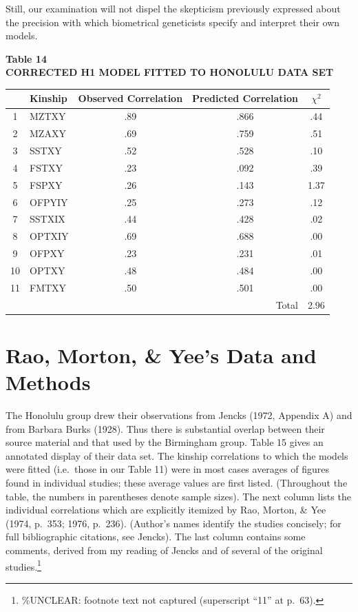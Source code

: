 ﻿\documentclass[12pt]{article}
\begin{document}
Still, our examination will not dispel the skepticism previously expressed about the precision with which biometrical geneticists specify and interpret their own models.

\begin{center}
\textbf{Table 14}\\
\textbf{CORRECTED H1 MODEL FITTED TO HONOLULU DATA SET}
\end{center}
\begin{center}
\begin{tabular}{c l c c c}
\hline
 & Kinship & Observed Correlation & Predicted Correlation & $\chi^2$ \\
\hline
1 & MZTXY & .89 & .866 & .44 \\
2 & MZAXY & .69 & .759 & .51 \\
3 & SSTXY & .52 & .528 & .10 \\
4 & FSTXY & .23 & .092 & .39 \\
5 & FSPXY & .26 & .143 & 1.37 \\
6 & OFPYIY & .25 & .273 & .12 \\
7 & SSTXIX & .44 & .428 & .02 \\
8 & OPTXIY & .69 & .688 & .00 \\
9 & OFPXY & .23 & .231 & .01 \\
10 & OPTXY & .48 & .484 & .00 \\
11 & FMTXY & .50 & .501 & .00 \\
\hline
\multicolumn{4}{r}{Total} & 2.96 \\
\hline
\end{tabular}
\end{center}

\section{Rao, Morton, \& Yee's Data and Methods}

The Honolulu group drew their observations from Jencks (1972, Appendix A) and from Barbara Burks (1928). Thus there is substantial overlap between their source material and that used by the Birmingham group. Table 15 gives an annotated display of their data set. The kinship correlations to which the models were fitted (i.e.\ those in our Table 11) were in most cases averages of figures found in individual studies; these average values are first listed. (Throughout the table, the numbers in parentheses denote sample sizes). The next column lists the individual correlations which are explicitly itemized by Rao, Morton, \& Yee (1974, p.\ 353; 1976, p.\ 236). (Author's names identify the studies concisely; for full bibliographic citations, see Jencks). The last column contains some comments, derived from my reading of Jencks and of several of the original studies.\footnote{\%UNCLEAR: footnote text not captured (superscript ``11'' at p.\ 63).}
\end{document}
